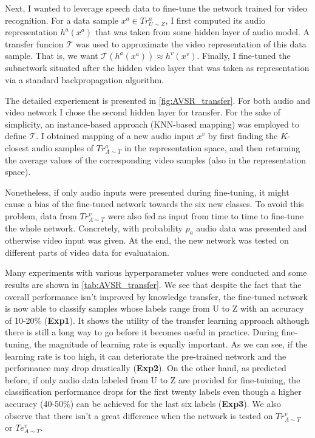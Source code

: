 Next, I wanted to leverage speech data to fine-tune the network trained for
video recognition. For a data sample $x^a\in Tr_{U\sim Z}^a$, I first
computed its audio representation $h^a(x^a)$ that was taken from some
hidden layer of audio model. A transfer funcion $\mathcal{T}$ was used
to approximate the video representation of this data sample.
That is, we want $\mathcal{T}(h^a(x^a))\approx h^v(x^v)$. Finally, I
fine-tuned the subnetwork situated after the hidden video layer that
was taken as representation via a standard backpropagation algorithm.

The detailed experiement is presented in \autoref{fig:AVSR_transfer}.
For both audio and video network I chose the second hidden layer for
transfer. For the sake of simplicity, an instance-based approach
(KNN-based mapping) was employed to define $\mathcal{T}$.
I obtained mapping of a new audio
input $x^v$ by first finding the $K$-closest audio samples of
$Tr_{A\sim T}^a$ in the representation space, and then returning the
average values of the corresponding video samples
(also in the representation space).

Nonetheless, if only audio inputs were presented during fine-tuning, it
might cause a bias of the fine-tuned network towards the six new classes.
To avoid this problem, data from $Tr_{A\sim T}^v$ were also fed as input
from time to time to fine-tune the whole network. Concretely, with
probability $p_a$ audio data was presented and otherwise video input
was given. At the end, the new network was tested on different parts of
video data for evaluataion.

Many experiments with various hyperparameter values were conducted
and some results are shown in \autoref{tab:AVSR_transfer}.
We see that despite the fact that the overall performance isn't improved
by knowledge transfer, the fine-tuned network is now able to classify
samples whose labels range from U to Z with an accuracy of 10-20\%
(\textbf{Exp1}). It shows the utility of the transfer learning approach
although there is still a long way to go before it becomes
useful in practice.
During fine-tuning, the magnitude of learning rate is equally important.
As we can see, if the learning rate is too high, it can deteriorate
the pre-trained network and the performance may drop drastically
(\textbf{Exp2}).
On the other hand, as predicted before, if only audio data labeled from
U to Z are provided for fine-tuining, the classification performance
drops for the first twenty labels even though a higher accuracy (40-50\%)
can be achieved for the last six labels (\textbf{Exp3}).
We also observe that there isn't a great difference when the network is
tested on $Tr_{A\sim T}^v$ or $Te_{A\sim T}^v$.

